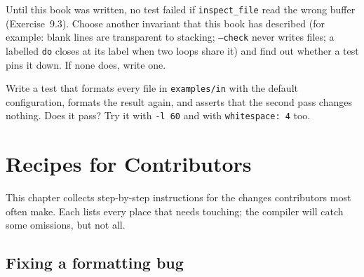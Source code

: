 \documentclass[11pt,a4paper,openany]{book}
\newcommand{\code}[1]{\texttt{\small #1}}
\newcommand{\file}[1]{\texttt{\small\color{accent}#1}}
\newcounter{exercise}[chapter]
\begin{document}
\begin{exercise}
Until this book was written, no test failed if \code{inspect\_file} read the
wrong buffer (Exercise~9.3). Choose another invariant that this book has described (for
example: blank lines are transparent to stacking; \code{--check} never writes
files; a labelled \code{do} closes at its label when two loops share it) and
find out whether a test pins it down. If none does, write one.
\end{exercise}

\begin{exercise}
Write a test that formats every file in \file{examples/in} with the default
configuration, formats the result again, and asserts that the second pass
changes nothing. Does it pass? Try it with \code{-l 60} and with
\code{whitespace: 4} too.
\end{exercise}

\chapter{Recipes for Contributors}\label{ch:recipes}

This chapter collects step-by-step instructions for the changes contributors
most often make. Each lists every place that needs touching; the compiler will
catch some omissions, but not all.

\section{Fixing a formatting bug}
\end{document}
